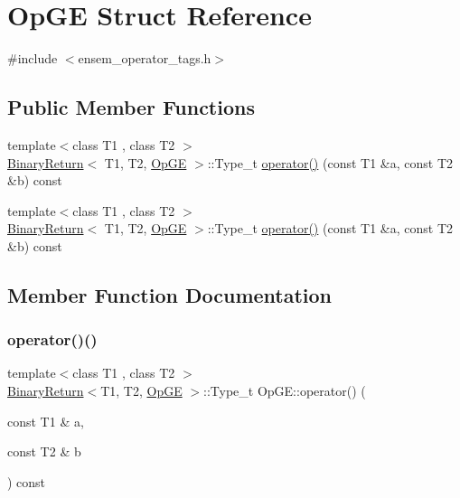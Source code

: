 \hypertarget{structOpGE}{}\section{Op\+GE Struct Reference}
\label{structOpGE}


{\ttfamily \#include $<$ensem\+\_\+operator\+\_\+tags.\+h$>$}

\subsection*{Public Member Functions}
\begin{DoxyCompactItemize}
\item 
{\footnotesize template$<$class T1 , class T2 $>$ }\\\mbox{\hyperlink{structBinaryReturn}{Binary\+Return}}$<$ T1, T2, \mbox{\hyperlink{structOpGE}{Op\+GE}} $>$\+::Type\+\_\+t \mbox{\hyperlink{structOpGE_a464b5c9cd38cdcfa8a0d8349c76e99a7}{operator()}} (const T1 \&a, const T2 \&b) const
\item 
{\footnotesize template$<$class T1 , class T2 $>$ }\\\mbox{\hyperlink{structBinaryReturn}{Binary\+Return}}$<$ T1, T2, \mbox{\hyperlink{structOpGE}{Op\+GE}} $>$\+::Type\+\_\+t \mbox{\hyperlink{structOpGE_a464b5c9cd38cdcfa8a0d8349c76e99a7}{operator()}} (const T1 \&a, const T2 \&b) const
\end{DoxyCompactItemize}


\subsection{Member Function Documentation}
\mbox{\label{structOpGE_a464b5c9cd38cdcfa8a0d8349c76e99a7}} 
\subsubsection{\texorpdfstring{operator()()}{operator()()}\hspace{0.1cm}{\footnotesize\ttfamily [1/2]}}
{\footnotesize\ttfamily template$<$class T1 , class T2 $>$ \\
\mbox{\hyperlink{structBinaryReturn}{Binary\+Return}}$<$T1, T2, \mbox{\hyperlink{structOpGE}{Op\+GE}} $>$\+::Type\+\_\+t Op\+G\+E\+::operator() (\begin{DoxyParamCaption}\item[{const T1 \&}]{a,  }\item[{const T2 \&}]{b }\end{DoxyParamCaption}) const\hspace{0.3cm}{\ttfamily [inline]}}

